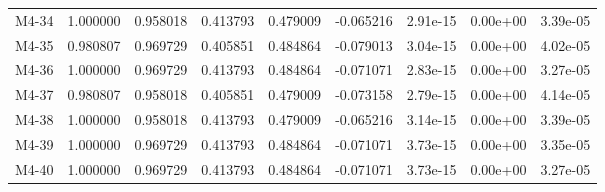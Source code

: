 \begin{longtable}{@{}lrrrrrrrr@{}}
M4-34 & 1.000000 & 0.958018 & 0.413793 & 0.479009 & -0.065216 & 2.91e-15 & 0.00e+00 & 3.39e-05\\
M4-35 & 0.980807 & 0.969729 & 0.405851 & 0.484864 & -0.079013 & 3.04e-15 & 0.00e+00 & 4.02e-05\\
M4-36 & 1.000000 & 0.969729 & 0.413793 & 0.484864 & -0.071071 & 2.83e-15 & 0.00e+00 & 3.27e-05\\
M4-37 & 0.980807 & 0.958018 & 0.405851 & 0.479009 & -0.073158 & 2.79e-15 & 0.00e+00 & 4.14e-05\\
M4-38 & 1.000000 & 0.958018 & 0.413793 & 0.479009 & -0.065216 & 3.14e-15 & 0.00e+00 & 3.39e-05\\
M4-39 & 1.000000 & 0.969729 & 0.413793 & 0.484864 & -0.071071 & 3.73e-15 & 0.00e+00 & 3.35e-05\\
M4-40 & 1.000000 & 0.969729 & 0.413793 & 0.484864 & -0.071071 & 3.73e-15 & 0.00e+00 & 3.27e-05\\
\bottomrule
\end{longtable}
